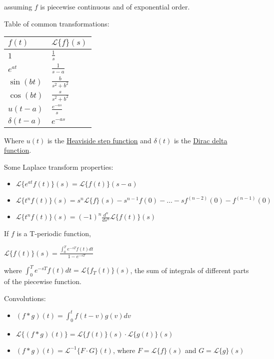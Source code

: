 \documentclass[12pt]{article}
\begin{document}
assuming \(f\) is piecewise continuous and of exponential order.

Table of common transformations:

\begin{center}
\begin{tabular}{ll}
\(f(t)\) & \(\mathcal{L}\{f\}(s)\)\\
\hline
\(1\) & \(\frac{1}{s}\)\\
\(e^{at}\) & \(\frac{1}{s-a}\)\\
\(\sin(bt)\) & \(\frac{b}{s^2+b^2}\)\\
\(\cos(bt)\) & \(\frac{s}{s^2+b^2}\)\\
\(u(t-a)\) & \(\frac{e^{-as}}{s}\)\\
\(\delta(t-a)\) & \(e^{-as}\)\\
\end{tabular}
\end{center}

Where \(u(t)\) is the \href{https://en.wikipedia.org/wiki/Heaviside\_step\_function}{Heaviside step function} and \(\delta(t)\) is the \href{https://en.wikipedia.org/wiki/Dirac\_delta\_function}{Dirac
delta function}.

Some Laplace transform properties:

\begin{itemize}
\item \(\mathcal{L}\{e^{at}f(t)\}(s) = \mathcal{L}\{f(t)\}(s-a)\)
\item \(\mathcal{L}\{t^nf(t)\}(s) = s^n\mathcal{L}\{f\}(s)-s^{n-1}f(0)-\ldots-sf^{(n-2)}(0)-f^{(n-1)}(0)\)
\item \(\mathcal{L}\{t^nf(t)\}(s) = (-1)^n \frac{d^n}{ds^n} \mathcal{L}\{f(t)\}(s)\)
\end{itemize}

If \(f\) is a T-periodic function, 

\(\mathcal{L}\{f(t)\}(s) = \frac{\int_0^T e^{-sT} f(t) dt}{1-e^{-sT}}\)

where \(\int_0^T e^{-sT} f(t) dt = \mathcal{L}\{f_T(t)\}(s)\), the sum of
integrals of different parts of the piecewise function.

Convolutions:

\begin{itemize}
\item \((f*g)(t) = \int_0^t f(t-v)g(v)dv\)
\item \(\mathcal{L}\{(f*g)(t)\} = \mathcal{L}\{f(t)\}(s)\cdot \mathcal{L}\{g(t)\}(s)\)
\item \((f*g)(t) = \mathcal{L}^{-1}\{F\cdot G\}(t)\), where
\(F=\mathcal{L}\{f\}(s)\) and \(G=\mathcal{L}\{g\}(s)\)
\end{itemize}
\end{document}
